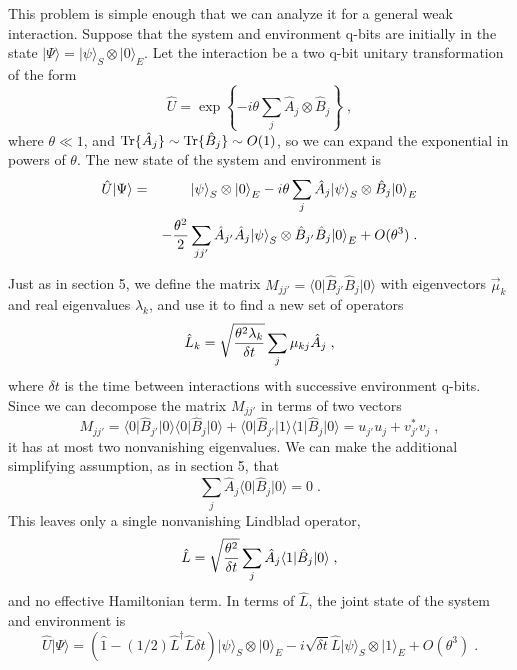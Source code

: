 \documentclass[12pt]{article}
\def\bra#1{{\langle #1 |}}
\def\ket#1{{| #1 \rangle}}
\def\id{{\hat 1}}
\def\tr{{\rm Tr}}
\def\U{{\hat U}}
\def\A{{\hat A}}
\def\B{{\hat B}}
\def\L{{\hat L}}
\def\Ldag{{\hat L^\dagger}}
\begin{document}
This problem is simple enough that we can analyze it for a general
weak interaction.  Suppose that the system and environment q-bits are
initially in the state $\ket\Psi = \ket\psi_S\otimes\ket0_E$.
Let the interaction be a two q-bit unitary transformation of the form
\begin{equation}
\U = \exp\left\{ - i \theta \sum_j \A_j\otimes\B_j \right\} \;,
\end{equation}
where $\theta\ll1$,
and $\tr\{\A_j\} \sim \tr\{\B_j\} \sim O(1)$, so we
can expand the exponential in powers of $\theta$.  The new state of
the system and environment is
\begin{eqnarray}
\U\ket\Psi &=& \ket\psi_S\otimes\ket0_E
  - i \theta \sum_j \A_j\ket\psi_S\otimes\B_j\ket0_E
  \nonumber\\
&& - {\theta^2\over2}\sum_{jj'} \A_{j'}\A_j\ket\psi_S \otimes
  \B_{j'}\B_j\ket0_E + O(\theta^3) \;.
\end{eqnarray}

Just as in section 5, we define the matrix
$M_{jj'} = \bra0\B_{j'}\B_j\ket0$ with eigenvectors ${\vec\mu}_k$ and
real eigenvalues $\lambda_k$, and use it to find a new set of operators
\begin{equation}
\L_k = \sqrt{\theta^2\lambda_k\over\delta t} \sum_j \mu_{kj} \A_j \;,
\end{equation}
where $\delta t$ is the time between interactions with successive
environment q-bits.
Since we can decompose the matrix $M_{jj'}$ in terms of two vectors
\begin{equation}
M_{jj'} = \bra0\B_{j'}\ket0\bra0\B_j\ket0
  + \bra0\B_{j'}\ket1\bra1\B_j\ket0 = u_{j'}u_{j} + v_{j'}^*v_j \;,
\end{equation}
it has at most two nonvanishing eigenvalues.
We can make the additional simplifying assumption, as in section 5, that
\begin{equation}
\sum_j \A_j \bra0\B_j\ket0 = 0 \;.
\label{first_order}
\end{equation}
This leaves only a single nonvanishing Lindblad operator,
\begin{equation}
\L = \sqrt{\theta^2\over\delta t} \sum_j \A_j \bra1\B_j\ket0 \;,
\end{equation}
and no effective Hamiltonian term.
In terms of $\L$, the joint state of the system and environment is
\begin{equation}
\U\ket\Psi = (\id - (1/2)\Ldag\L \delta t) \ket\psi_S\otimes\ket0_E
  - i \sqrt{\delta t} \L\ket\psi_S\otimes\ket1_E
  + O(\theta^3) \;.
\end{equation}
\end{document}
